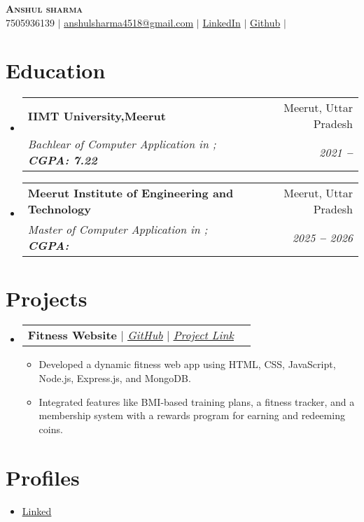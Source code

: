 \documentclass[letterpaper,11pt]{article}
\makeatletter
\newcommand{\resumeItem}[1]{
  \item\small{
    {#1 \vspace{-2pt}}
  }
}
\newcommand{\resumeSubheading}[4]{
  \vspace{-2pt}\item
    \begin{tabular*}{0.97\textwidth}[t]{l@{\extracolsep{\fill}}r}
      \textbf{#1} & #2 \\
      \textit{\small#3} & \textit{\small #4} \\
    \end{tabular*}\vspace{-7pt}
}
\newcommand{\resumeProjectHeading}[2]{
    \vspace{-2pt}\item
    \begin{tabular*}{0.97\textwidth}{l@{\extracolsep{\fill}}r}
      \small#1 & #2 \\
    \end{tabular*}\vspace{-7pt}
}
\newcommand{\resumeSubHeadingListStart}{\begin{itemize}[leftmargin=0.15in, label={}]}
\newcommand{\resumeSubHeadingListEnd}{\end{itemize}}
\newcommand{\resumeItemListStart}{\begin{itemize}}
\newcommand{\resumeItemListEnd}{\end{itemize}\vspace{-5pt}}
\makeatother
\begin{document}

\begin{center}
    \textbf{\Huge \scshape Anshul  sharma} \\ \vspace{3pt}
    \small
    \faMobile \hspace{.5pt} {7505936139}
    $|$
    \faAt \hspace{.5pt} \href{mailto:anshulsharma4518@gmail.com}{anshulsharma4518@gmail.com}
    $|$
    \faLinkedinSquare \hspace{.5pt} \href{https://www.linkedin.com/in/anshul-sharma-122011249}{LinkedIn}
    $|$
    \faGithub \hspace{.5pt} \href{https://github.com/anshulpandit007}{Github}
    $|$
    
\end{center}




\section{Education}
  \vspace{3pt}
  \resumeSubHeadingListStart

  
\resumeSubheading
{IIMT University,Meerut
}{Meerut, Uttar Pradesh}
{Bachlear of Computer Application in ;   \textbf{CGPA: 7.22}}{2021 \textbf{--} }

\resumeSubheading
{Meerut Institute of Engineering and Technology
}{Meerut, Uttar Pradesh}
{Master of Computer Application in ;   \textbf{CGPA: }}{2025 \textbf{--} 2026}


  \resumeSubHeadingListEnd



\section{Projects}
  \vspace{3pt}
  \resumeSubHeadingListStart

  
\resumeProjectHeading
{\textbf{Fitness Website} $|$ \underline{\emph{\href{github.com/anshulpandit007/Fitness-Website}{GitHub}}} $|$ \underline{\emph{\href{jttfront.onrender.com}{Project Link}}}} {}
      \resumeItemListStart
      \resumeItem{Developed a dynamic fitness web app using HTML, CSS, JavaScript, Node.js, Express.js, and MongoDB.}\resumeItem{Integrated features like BMI-based training plans, a fitness tracker, and a membership system with a rewards
program for earning and redeeming coins.}
        \resumeItemListEnd


  \resumeSubHeadingListEnd




\section{Profiles}
  \vspace{2pt}
  \resumeItemListStart
  \resumeItem{\underline{\href{}{Linked }}}
  \resumeItemListEnd

\end{document}

